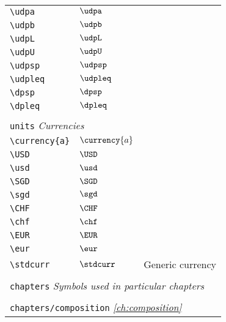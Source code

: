 \begin{longtable}{lll}
 {\color[rgb]{0.5,0.5,0.5}\texttt{\textbackslash udpa}} & $\udpa$ & \\ 
 {\color[rgb]{0.5,0.5,0.5}\texttt{\textbackslash udpb}} & $\udpb$ & \\ 
 {\color[rgb]{0.5,0.5,0.5}\texttt{\textbackslash udpL}} & $\udpL$ & \\ 
 {\color[rgb]{0.5,0.5,0.5}\texttt{\textbackslash udpU}} & $\udpU$ & \\ 
 {\color[rgb]{0.5,0.5,0.5}\texttt{\textbackslash udpsp}} & $\udpsp$ & \\ 
 {\color[rgb]{0.5,0.5,0.5}\texttt{\textbackslash udpleq}} & $\udpleq$ & \\ 
 {\color[rgb]{0.5,0.5,0.5}\texttt{\textbackslash dpsp}} & $\dpsp$ & \\ 
 {\color[rgb]{0.5,0.5,0.5}\texttt{\textbackslash dpleq}} & $\dpleq$ & \\ 
  &  & \\ 
 \multicolumn{3}{l}{{\color[rgb]{0.5,0.5,0.5}\texttt{units}} \emph{Currencies}}\\ 
 \hline
\hline
{\color[rgb]{0.5,0.5,0.5}\texttt{\textbackslash currency\{a\}}} & $\currency{a}$ & \\ 
 {\color[rgb]{0.5,0.5,0.5}\texttt{\textbackslash USD}} & $\USD$ & \\ 
 {\color[rgb]{0.5,0.5,0.5}\texttt{\textbackslash usd}} & $\usd$ & \\ 
 {\color[rgb]{0.5,0.5,0.5}\texttt{\textbackslash SGD}} & $\SGD$ & \\ 
 {\color[rgb]{0.5,0.5,0.5}\texttt{\textbackslash sgd}} & $\sgd$ & \\ 
 {\color[rgb]{0.5,0.5,0.5}\texttt{\textbackslash CHF}} & $\CHF$ & \\ 
 {\color[rgb]{0.5,0.5,0.5}\texttt{\textbackslash chf}} & $\chf$ & \\ 
 {\color[rgb]{0.5,0.5,0.5}\texttt{\textbackslash EUR}} & $\EUR$ & \\ 
 {\color[rgb]{0.5,0.5,0.5}\texttt{\textbackslash eur}} & $\eur$ & \\ 
 {\color[rgb]{0.5,0.5,0.5}\texttt{\textbackslash stdcurr}} & $\stdcurr$ &  Generic currency\\ 
  &  & \\ 
 \multicolumn{3}{l}{{\color[rgb]{0.5,0.5,0.5}\texttt{chapters}} \emph{Symbols used in particular chapters}}\\ 
 \hline
\hline
 &  & \\ 
 \multicolumn{3}{l}{{\color[rgb]{0.5,0.5,0.5}\texttt{chapters/composition}} \emph{\cref{ch:composition}}}\\ 

\end{longtable}
